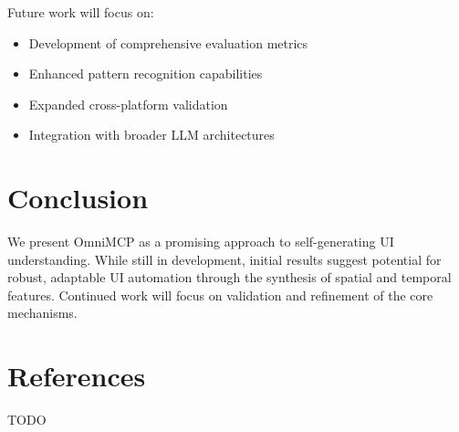 \documentclass{article}
\begin{document}
Future work will focus on:
\begin{itemize}
    \item Development of comprehensive evaluation metrics
    \item Enhanced pattern recognition capabilities
    \item Expanded cross-platform validation
    \item Integration with broader LLM architectures
\end{itemize}

\section{Conclusion}
We present OmniMCP as a promising approach to self-generating UI understanding. While still in development, initial results suggest potential for robust, adaptable UI automation through the synthesis of spatial and temporal features. Continued work will focus on validation and refinement of the core mechanisms.

\section{References}
TODO
\end{document}
